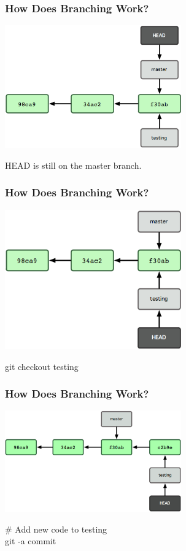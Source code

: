 \begin{frame}
\frametitle{\large How Does Branching Work?}
\begin{center}
\includegraphics[width=0.57\textwidth]{img/branching_images/fig5.png}
\end{center}
\vspace{2mm}
\begin{center}
HEAD is still on the master branch.
\end{center}
\end{frame}
\note{}

\begin{frame}
\frametitle{\large How Does Branching Work?}
\begin{center}
\includegraphics[width=0.57\textwidth]{img/branching_images/fig6.png}
\end{center}
\vspace{2mm}
\begin{center}
git checkout testing
\end{center}
\end{frame}
\note{}

\begin{frame}
\frametitle{\large How Does Branching Work?}
\begin{center}
\includegraphics[width=0.57\textwidth]{img/branching_images/fig7.png}
\end{center}
\vspace{2mm}
\begin{center}
\# Add new code to testing\\
git -a commit
\end{center}
\end{frame}
\note{}

